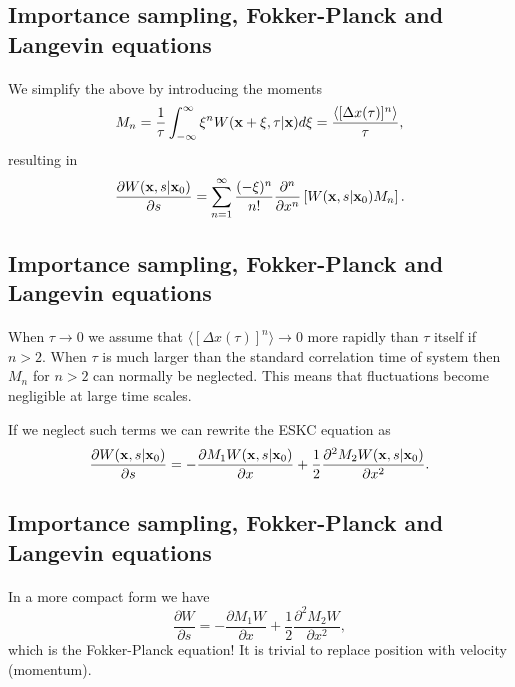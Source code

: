 \documentclass[%
twoside,                 %
final,                   %
10pt]{article}
\begin{document}
{{{{{{%
\subsection{Importance sampling, Fokker-Planck and Langevin equations}

\paragraph{}
We simplify the above by introducing the moments 
\[
M_n=\frac{1}{\tau}\int_{-\infty}^{\infty} \xi^nW({\bf x}+\xi,\tau|{\bf x})d\xi=
\frac{\langle [\Delta x(\tau)]^n\rangle}{\tau},
\]
resulting in
\[
\frac{\partial W({\bf x},s|{\bf x}_0)}{\partial s}=
\sum_{n=1}^{\infty}\frac{(-\xi)^n}{n!}\frac{\partial^n}{\partial x^n}
\left[W({\bf x},s|{\bf x}_0)M_n\right].
\]




\subsection{Importance sampling, Fokker-Planck and Langevin equations}

\paragraph{}
When $\tau \rightarrow 0$ we assume that $\langle [\Delta x(\tau)]^n\rangle \rightarrow 0$ more rapidly than $\tau$ itself if $n > 2$. 
When $\tau$ is much larger than the standard correlation time of 
system then $M_n$ for $n > 2$ can normally be neglected.
This means that fluctuations become negligible at large time scales.

If we neglect such terms we can rewrite the ESKC equation as 
\[
\frac{\partial W({\bf x},s|{\bf x}_0)}{\partial s}=
-\frac{\partial M_1W({\bf x},s|{\bf x}_0)}{\partial x}+
\frac{1}{2}\frac{\partial^2 M_2W({\bf x},s|{\bf x}_0)}{\partial x^2}.
\]




\subsection{Importance sampling, Fokker-Planck and Langevin equations}

\paragraph{}
In a more compact form we have
\[
\frac{\partial W}{\partial s}=
-\frac{\partial M_1W}{\partial x}+
\frac{1}{2}\frac{\partial^2 M_2W}{\partial x^2},
\]
which is the Fokker-Planck equation!  It is trivial to replace 
position with velocity (momentum).




}}}}}}
\end{document}
